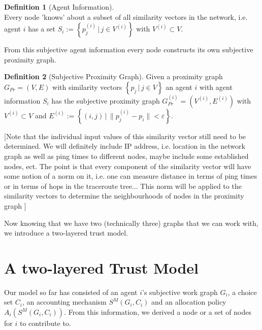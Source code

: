 \documentclass[11pt,a4paper]{report}
\theoremstyle{definition}
\newtheorem{definition}{Definition}[section]
\theoremstyle{theorem}
\theoremstyle{proposition}
\theoremstyle{corollary}
\theoremstyle{lemma}
\theoremstyle{example}
\theoremstyle{remark}
\begin{document}
\begin{definition}[Agent Information]\ \\
Every node 'knows' about a subset of all similarity vectors in the network, i.e. agent $i$ has a set $S_i:=\left\lbrace{}p^{(i)}_j\,|\,j\in{}V^{(i)}\right\rbrace$ with $V^{(i)}\subset{}V$.
\end{definition}
\noindent{}From this subjective agent information every node constructs its own subjective proximity graph.
\begin{definition}[Subjective Proximity Graph]
Given a proximity graph $G_{Pr}=(V,E)$ with similarity vectors $\left\lbrace{}p_j\,|\,j\in{}V\right\rbrace$ an agent $i$ with agent information $S_i$ has the subjective proximity graph $G_{Pr}^{(i)}=(V^{(i)},E^{(i)})$ with $V^{(i)}\subset{}V$ and $E^{(i)}:=\left\lbrace{}(i,j)\,|\,\|p^{(i)}_j-p_i\|<\varepsilon\right\rbrace$.
\end{definition}


\noindent{} \begin{center} [Note that the individual input values of this similarity vector still need to be determined. We will definitely include IP address, i.e. location in the network graph as well as ping times to different nodes, maybe include some established nodes, ect. The point is that every component of the similarity vector will have some notion of a norm on it, i.e. one can measure distance in terms of ping times or in terms of hops in the traceroute tree... This norm will be applied to the similarity vectors to determine the neighbourhoods of nodes in the proximity graph ] \vspace{1em}\\ \end{center}

\noindent{}Now knowing that we have two (technically three) graphs that we can work with, we introduce a two-layered trust model.\vspace{1em}\\

\section{A two-layered Trust Model}
\label{sec:A two-layered Trust Model}
Our model so far has consisted of an agent $i$'s subjective work graph $G_i$, a choice set $C_i$, an accounting mechanism $S^M(G_i,C_i)$ and an allocation policy $A_i(S^M(G_i,C_i))$. From this information, we derived a node or a set of nodes for $i$ to contribute to. 
\end{document}
